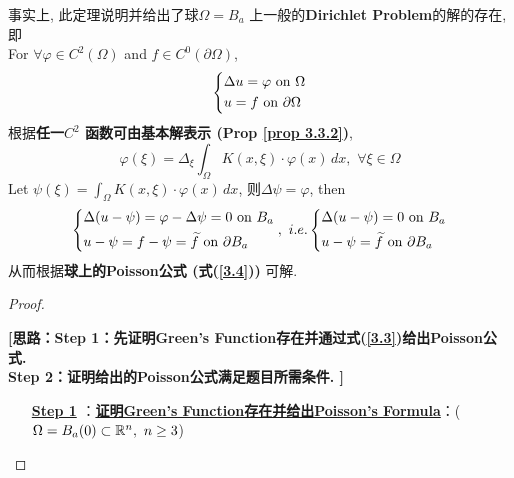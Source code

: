 \begin{thm}
		\begin{rmk}
			事实上, 此定理说明并给出了球$\Omega = B_a$ 上一般的\textbf{Dirichlet Problem}的解的存在, 即 \\
			For $\forall \varphi \in C^2(\Omega)$ and $f \in C^0(\partial \Omega)$, 
			\begin{align*}
				\begin{dcases*}
					\Delta u = \varphi \,\, \text{on} \,\, \Omega \\
					u = f \,\, \text{on} \,\, \partial \Omega
				\end{dcases*}
			\end{align*}
			根据\textbf{任一$C^2$ 函数可由基本解表示 (Prop \ref{prop 3.3.2})}, 
			\[ \varphi(\xi) = \Delta_\xi \int_{\Omega} K(x , \xi) \cdot \varphi(x) \, dx , \,\, \forall \xi \in \Omega \]
			Let $\psi(\xi) = \int_{\Omega} K(x , \xi) \cdot \varphi(x) \, dx$, 则$\Delta \psi = \varphi$, then
			\begin{align*}
				\begin{dcases*}
					\Delta (u - \psi) = \varphi - \Delta \psi = 0 \,\, \text{on} \,\, B_a \\
					u - \psi = f - \psi = \widetilde{f} \,\, \text{on} \,\, \partial B_a
				\end{dcases*} , \,\, i.e.
				\begin{dcases*}
					\Delta (u - \psi) = 0 \,\, \text{on} \,\, B_a \\
					u - \psi = \widetilde{f} \,\, \text{on} \,\, \partial B_a
				\end{dcases*}
			\end{align*}
			从而根据\textbf{球上的Poisson公式 (式(\ref{3.4}))} 可解. 
		\end{rmk}
		
		\newpage
		
		\begin{proof}
			\begin{center}
				\textbf{[思路：Step 1：先证明Green's Function存在并通过式(\ref{3.3})给出Poisson公式. \\
					Step 2：证明给出的Poisson公式满足题目所需条件. ]}
			\end{center}
			
			\vspace*{1em}
			
			\begin{enumerate}
				\item[\underline{\textbf{Step 1}}]：\underline{\textbf{证明Green's Function存在并给出Poisson's Formula}}：($\Omega = B_a(0) \subset \mathbb{R}^n , \,\, n \geq 3$) 
				

\end{enumerate}
\end{proof}
\end{thm}

